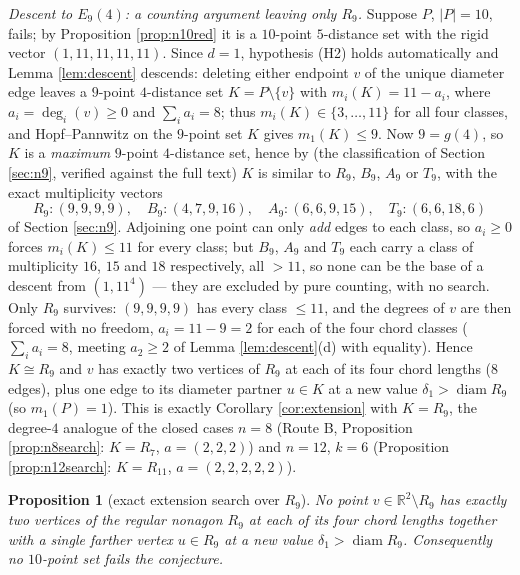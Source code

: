 \documentclass[11pt]{article}
\newtheorem{proposition}[theorem]{Proposition}
\theoremstyle{definition}
\theoremstyle{remark}
\newcommand{\R}{\mathbb{R}}
\DeclareMathOperator{\diam}{diam}
\begin{document}
\emph{Descent to $E_9(4)$: a counting argument leaving only $R_9$.} Suppose $P$,
$|P| = 10$, fails; by Proposition \ref{prop:n10red} it is a $10$-point $5$-distance set
with the rigid vector $(1,11,11,11,11)$. Since $d = 1$, hypothesis (H2) holds
automatically and Lemma \ref{lem:descent} descends: deleting either endpoint $v$ of the
unique diameter edge leaves a $9$-point $4$-distance set $K = P \setminus \{v\}$ with
$m_i(K) = 11 - a_i$, where $a_i = \deg_i(v) \ge 0$ and $\sum_i a_i = 8$; thus
$m_i(K) \in \{3, \dots, 11\}$ for all four classes, and Hopf--Pannwitz on the $9$-point
set $K$ gives $m_1(K) \le 9$. Now $9 = g(4)$, so $K$ is a \emph{maximum} $9$-point
$4$-distance set, hence by \cite[Theorem~1]{ErFi96} (the classification of Section
\ref{sec:n9}, verified against the full text) $K$ is similar to $R_9$, $B_9$, $A_9$ or
$T_9$, with the exact multiplicity vectors
\[
R_9 : (9,9,9,9), \quad B_9 : (4,7,9,16), \quad A_9 : (6,6,9,15), \quad T_9 : (6,6,18,6)
\]
of Section \ref{sec:n9}. Adjoining one point can only \emph{add} edges to each class, so
$a_i \ge 0$ forces $m_i(K) \le 11$ for every class; but $B_9$, $A_9$ and $T_9$ each carry
a class of multiplicity $16$, $15$ and $18$ respectively, all $> 11$, so none can be the
base of a descent from $(1,11^4)$ --- they are excluded by pure counting, with no search.
Only $R_9$ survives: $(9,9,9,9)$ has every class $\le 11$, and the degrees of $v$ are then
forced with no freedom, $a_i = 11 - 9 = 2$ for each of the four chord classes
($\sum_i a_i = 8$, meeting $a_2 \ge 2$ of Lemma \ref{lem:descent}(d) with equality). Hence
$K \cong R_9$ and $v$ has exactly two vertices of $R_9$ at each of its four chord lengths
($8$ edges), plus one edge to its diameter partner $u \in K$ at a new value
$\delta_1 > \diam R_9$ (so $m_1(P) = 1$). This is exactly Corollary \ref{cor:extension}
with $K = R_9$, the degree-$4$ analogue of the closed cases $n = 8$ (Route B, Proposition
\ref{prop:n8search}: $K = R_7$, $a = (2,2,2)$) and $n = 12$, $k = 6$ (Proposition
\ref{prop:n12search}: $K = R_{11}$, $a = (2,2,2,2,2)$).

\begin{proposition}[exact extension search over $R_9$]\label{prop:n10search}
No point $v \in \R^2 \setminus R_9$ has exactly two vertices of the regular nonagon $R_9$
at each of its four chord lengths together with a single farther vertex $u \in R_9$ at a
new value $\delta_1 > \diam R_9$. Consequently no $10$-point set fails the conjecture.
\end{proposition}
\end{document}
